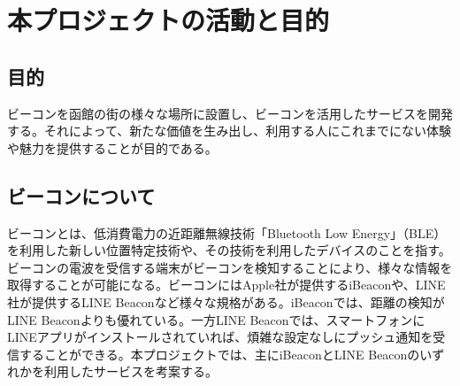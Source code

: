 \chapter{本プロジェクトの活動と目的}

\section{目的}
ビーコンを函館の街の様々な場所に設置し、ビーコンを活用したサービスを開発する。それによって、新たな価値を生み出し、利用する人にこれまでにない体験や魅力を提供することが目的である。

\section{ビーコンについて}
ビーコンとは、低消費電力の近距離無線技術「Bluetooth Low Energy」（BLE）を利用した新しい位置特定技術や、その技術を利用したデバイスのことを指す。ビーコンの電波を受信する端末がビーコンを検知することにより、様々な情報を取得することが可能になる。ビーコンにはApple社が提供するiBeaconや、LINE社が提供するLINE Beaconなど様々な規格がある。iBeaconでは、距離の検知がLINE Beaconよりも優れている。一方LINE Beaconでは、スマートフォンにLINEアプリがインストールされていれば、煩雑な設定なしにプッシュ通知を受信することができる。本プロジェクトでは、主にiBeaconとLINE Beaconのいずれかを利用したサービスを考案する。
